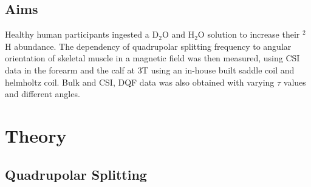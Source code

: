 \documentclass[class=article, crop=false]{standalone}
\begin{document}
\subsection{Aims}

Healthy human participants ingested a D$_2$O and H$_2$O solution to increase their $^2$H abundance. The dependency of quadrupolar splitting frequency to angular orientation of skeletal muscle in a magnetic field was then measured, using CSI data in the forearm and the calf at 3T using an in-house built saddle coil and helmholtz coil. Bulk and CSI, DQF data was also obtained with varying $\tau$ values and different angles. 

\section{Theory}
\subsection{Quadrupolar Splitting}
\end{document}
